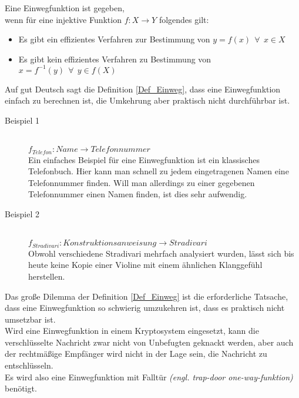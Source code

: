 \begin{Einweg}[Einwegfunktion]
\label{Def_Einweg}
Eine Einwegfunktion ist gegeben,\\
wenn für eine injektive Funktion \(f:X\rightarrow Y\) folgendes gilt:
\begin{itemize}
\item Es gibt ein effizientes Verfahren zur Bestimmung von $y=f(x)~~\forall~~x \in X $
\item Es gibt kein effizientes Verfahren zu Bestimmung von $x=f^{-1}(y)~~\forall~~y \in f(X)$
\end{itemize}
\end{Einweg} 
Auf gut Deutsch sagt die Definition \ref{Def_Einweg}, dass eine Einwegfunktion einfach zu berechnen ist, die Umkehrung aber praktisch nicht durchführbar ist.


\begin{description}
\item[Beispiel 1]\hfill \\
$f_{Telefon}:Name\rightarrow Telefonnummer$\\
Ein einfaches Beispiel für eine Einwegfunktion ist ein klassisches Telefonbuch. Hier kann man schnell zu jedem eingetragenen Namen eine Telefonnummer finden. Will man allerdings zu einer gegebenen Telefonnummer einen Namen finden, ist dies sehr aufwendig.
\item[Beispiel 2]\hfill \\
$f_{Stradivari}:Konstruktionsanweisung\rightarrow Stradivari$\\
Obwohl verschiedene Stradivari mehrfach analysiert wurden, lässt sich bis heute keine Kopie einer Violine mit einem ähnlichen Klanggefühl herstellen.
\end{description}
Das große Dilemma der Definition \ref{Def_Einweg} ist die erforderliche Tatsache, dass eine Einwegfunktion so schwierig umzukehren ist, dass es praktisch nicht umsetzbar ist.\\
Wird eine Einwegfunktion in einem Kryptosystem eingesetzt, kann die verschlüsselte Nachricht zwar nicht von Unbefugten geknackt werden, aber auch der rechtmäßige Empfänger wird nicht in der Lage sein, die Nachricht zu entschlüsseln.
\\
Es wird also eine Einwegfunktion mit Falltür \textit{(engl. trap-door one-way-funktion)} benötigt.

